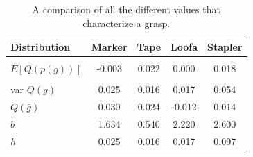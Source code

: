 \documentclass[letterpaper, 10 pt, conference]{ieeeconf}  %
\begin{document}
\begin{table}[ht!]
        \begin{tabular}{ l | c c c c}
         Distribution & \bf Marker & \bf Tape & \bf Loofa & \bf Stapler \\ 
        \hline \\
        $E[Q(p(g))]$ & -0.003 & 0.022 & 0.000 &  0.018\\
        \hline \\
        var $Q(g)$ & 0.025 & 0.016 & 0.017 &  0.054\\
        \hline 
        $Q(\bar{g})$ & 0.030 & 0.024 & -0.012 & 0.014\\
        \hline 
        $b$ & 1.634 & 0.540 & 2.220 & 2.600 \\
        \hline 
        $h$ & 0.025 & 0.016 & 0.017 & 0.097 \\
        \hline 
        \end{tabular}
        \caption{A comparison of all the different values that characterize a grasp.}
		
\vspace*{-20pt}
\end{table}



\end{document}
